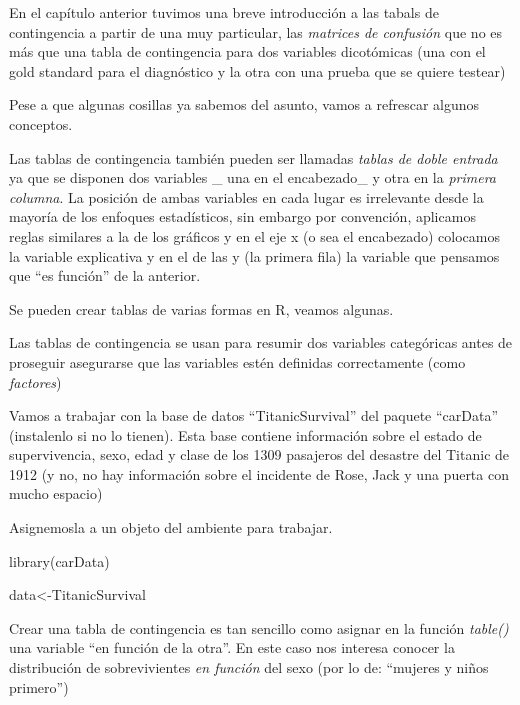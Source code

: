 \documentclass[
]{book}
\newenvironment{Shaded}{\begin{snugshade}}{\end{snugshade}}
\newcommand{\FunctionTok}[1]{\textcolor[rgb]{0.00,0.00,0.00}{#1}}
\newcommand{\NormalTok}[1]{#1}
\newcommand{\OtherTok}[1]{\textcolor[rgb]{0.56,0.35,0.01}{#1}}
\newcommand{\SpecialCharTok}[1]{\textcolor[rgb]{0.00,0.00,0.00}{#1}}
\begin{document}
En el capítulo anterior tuvimos una breve introducción a las tabals de contingencia a partir de una muy particular, las \emph{matrices de confusión} que no es más que una tabla de contingencia para dos variables dicotómicas (una con el gold standard para el diagnóstico y la otra con una prueba que se quiere testear)

Pese a que algunas cosillas ya sabemos del asunto, vamos a refrescar algunos conceptos.

Las tablas de contingencia también pueden ser llamadas \emph{tablas de doble entrada} ya que se disponen dos variables \_ una en el encabezado\_ y otra en la \emph{primera columna}. La posición de ambas variables en cada lugar es irrelevante desde la mayoría de los enfoques estadísticos, sin embargo por convención, aplicamos reglas similares a la de los gráficos y en el eje x (o sea el encabezado) colocamos la variable explicativa y en el de las y (la primera fila) la variable que pensamos que ``es función'' de la anterior.

Se pueden crear tablas de varias formas en R, veamos algunas.

Las tablas de contingencia se usan para resumir dos variables categóricas antes de proseguir asegurarse que las variables estén definidas correctamente (como \emph{factores})

Vamos a trabajar con la base de datos ``TitanicSurvival'' del paquete ``carData'' (instalenlo si no lo tienen). Esta base contiene información sobre el estado de supervivencia, sexo, edad y clase de los 1309 pasajeros del desastre del Titanic de 1912 (y no, no hay información sobre el incidente de Rose, Jack y una puerta con mucho espacio)

Asignemosla a un objeto del ambiente para trabajar.

\begin{Shaded}
\begin{Highlighting}[]
\FunctionTok{library}\NormalTok{(carData)}

\NormalTok{data}\OtherTok{\textless{}{-}}\NormalTok{TitanicSurvival}
\end{Highlighting}
\end{Shaded}

Crear una tabla de contingencia es tan sencillo como asignar en la función \emph{table()} una variable ``en función de la otra''. En este caso nos interesa conocer la distribución de sobrevivientes \emph{en función} del sexo (por lo de: ``mujeres y niños primero'')

\begin{Shaded}
\end{Shaded}
\end{document}
